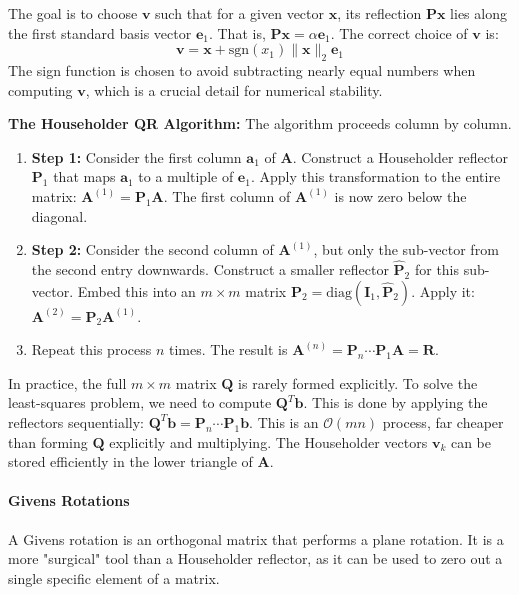 \begin{proposition}
The goal is to choose $\mathbf{v}$ such that for a given vector $\mathbf{x}$, its reflection $\mathbf{P}\mathbf{x}$ lies along the first standard basis vector $\mathbf{e}_1$. That is, $\mathbf{P}\mathbf{x} = \alpha \mathbf{e}_1$. The correct choice of $\mathbf{v}$ is:
\[ \mathbf{v} = \mathbf{x} + \text{sgn}(x_1) \|\mathbf{x}\|_2 \mathbf{e}_1 \]
The sign function is chosen to avoid subtracting nearly equal numbers when computing $\mathbf{v}$, which is a crucial detail for numerical stability.

\textbf{The Householder QR Algorithm:} The algorithm proceeds column by column.
\begin{enumerate}
    \item \textbf{Step 1:} Consider the first column $\mathbf{a}_1$ of $\mathbf{A}$. Construct a Householder reflector $\mathbf{P}_1$ that maps $\mathbf{a}_1$ to a multiple of $\mathbf{e}_1$. Apply this transformation to the entire matrix: $\mathbf{A}^{(1)} = \mathbf{P}_1 \mathbf{A}$. The first column of $\mathbf{A}^{(1)}$ is now zero below the diagonal.
    \item \textbf{Step 2:} Consider the second column of $\mathbf{A}^{(1)}$, but only the sub-vector from the second entry downwards. Construct a smaller reflector $\hat{\mathbf{P}}_2$ for this sub-vector. Embed this into an $m \times m$ matrix $\mathbf{P}_2 = \text{diag}(\mathbf{I}_1, \hat{\mathbf{P}}_2)$. Apply it: $\mathbf{A}^{(2)} = \mathbf{P}_2 \mathbf{A}^{(1)}$.
    \item Repeat this process $n$ times. The result is $\mathbf{A}^{(n)} = \mathbf{P}_n \cdots \mathbf{P}_1 \mathbf{A} = \mathbf{R}$.
\end{enumerate}
\begin{remark}[Implicit Q]
In practice, the full $m \times m$ matrix $\mathbf{Q}$ is rarely formed explicitly. To solve the least-squares problem, we need to compute $\mathbf{Q}^T\mathbf{b}$. This is done by applying the reflectors sequentially: $\mathbf{Q}^T\mathbf{b} = \mathbf{P}_n \cdots \mathbf{P}_1 \mathbf{b}$. This is an $\mathcal{O}(mn)$ process, far cheaper than forming $\mathbf{Q}$ explicitly and multiplying. The Householder vectors $\mathbf{v}_k$ can be stored efficiently in the lower triangle of $\mathbf{A}$.
\end{remark}

\paragraph{Givens Rotations}
A Givens rotation is an orthogonal matrix that performs a plane rotation. It is a more "surgical" tool than a Householder reflector, as it can be used to zero out a single specific element of a matrix.



\end{proposition}
